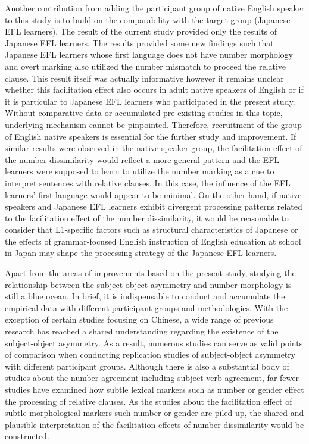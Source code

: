\documentclass[
]{article}
\begin{document}
Another contribution from adding the participant group of native English
speaker to this study is to build on the comparability with the target
group (Japanese EFL learners). The result of the current study provided
only the results of Japanese EFL learners. The results provided some new
findings such that Japanese EFL learners whose first language does not
have number morphology and overt marking also utilized the number
mismatch to proceed the relative clause. This result itself was actually
informative however it remains unclear whether this facilitation effect
also occurs in adult native speakers of English or if it is particular
to Japanese EFL learners who participated in the present study. Without
comparative data or accumulated pre-existing studies in this topic,
underlying mechanism cannot be pinpointed. Therefore, recruitment of the
group of English native speakers is essential for the further study and
improvement. If similar results were observed in the native speaker
group, the facilitation effect of the number dissimilarity would reflect
a more general pattern and the EFL learners were supposed to learn to
utilize the number marking as a cue to interpret sentences with relative
clauses. In this case, the influence of the EFL learners' first language
would appear to be minimal. On the other hand, if native speakers and
Japanese EFL learners exhibit divergent processing patterns related to
the facilitation effect of the number dissimilarity, it would be
reasonable to consider that L1-specific factors such as structural
characteristics of Japanese or the effects of grammar-focused English
instruction of English education at school in Japan may shape the
processing strategy of the Japanese EFL learners.

Apart from the areas of improvements based on the present study,
studying the relationship between the subject-object asymmetry and
number morphology is still a blue ocean. In brief, it is indispensable
to conduct and accumulate the empirical data with different participant
groups and methodologies. With the exception of certain studies focusing
on Chinese, a wide range of previous research has reached a shared
understanding regarding the existence of the subject-object asymmetry.
As a result, numerous studies can serve as valid points of comparison
when conducting replication studies of subject-object asymmetry with
different participant groups. Although there is also a substantial body
of studies about the number agreement including subject-verb agreement,
far fewer studies have examined how subtle lexical markers such as
number or gender effect the processing of relative clauses. As the
studies about the facilitation effect of subtle morphological markers
such number or gender are piled up, the shared and plausible
interpretation of the facilitation effects of number dissimilarity would
be constructed.
\end{document}
